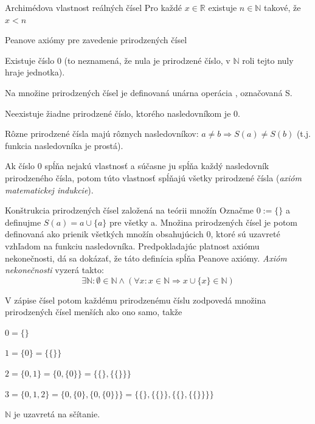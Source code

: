 \begin{vetaN}{Archimédova vlastnost reálných čísel}
	Pro každé $x \in \mathbb{R}$ existuje $n \in \mathbb{N}$ takové, že $x < n$
\end{vetaN}

\begin{vetaN}{Peanove axiómy pre zavedenie prirodzených čísel}
\begin{pitemize}
	\item Existuje číslo 0 (to neznamená, že nula je prirodzené číslo, v $\mathbb{N}$ roli tejto nuly hraje jednotka).
	\item Na množine prirodzených čísel je definovaná unárna operácia , označovaná S.
	\item Neexistuje žiadne prirodzené číslo, ktorého nasledovníkom je 0.
	\item Rôzne prirodzené čísla majú rôznych nasledovníkov: $a \neq b \Rightarrow S(a) \neq S(b)$ (t.j. funkcia nasledovníka je prostá).
	\item Ak číslo 0 spĺňa nejakú vlastnosť a súčasne ju spĺňa každý nasledovník prirodzeného čísla, potom túto vlastnosť spĺňajú všetky prirodzené čísla (\emph{axióm matematickej indukcie}).
\end{pitemize}
\end{vetaN}

\begin{vetaN}{Konštrukcia prirodzených čísel založená na teórii množín}
	Označme $0 := \{ \}$ a definujme $S(a) = a \cup \{a\}$ pre všetky a. Množina prirodzených čísel je potom definovaná ako prienik všetkých množín obsahujúcich $0$, ktoré sú uzavreté vzhľadom na funkciu nasledovníka. Predpokladajúc platnost axiómu nekonečnosti, dá sa dokázať, že táto definícia spĺňa Peanove axiómy. \emph{Axióm nekonečnosti} vyzerá takto:
$$\exists\mathbb{N}:\emptyset\in\mathbb{N}\wedge(\forall x:x\in \mathbb{N}\Rightarrow x\cup\{x\}\in\mathbb{N})$$
	
	V  zápise čísel potom každému prirodzenému číslu zodpovedá množina prirodzených čísel menších ako ono samo, takže
	\begin{pitemize}
		\item $0=\{\}$
		\item $1 = \{0\} = \{\{ \}\}$
		\item $2 = \{0,1\} = \{0, \{0\}\} = \{\{ \}, \{\{ \}\}\}$
		\item $3 = \{0,1,2\} = \{0, \{0\}, \{0, \{0\}\}\} = \{\{ \}, \{\{ \}\}, \{\{ \}, \{\{ \}\}\}\}$
	\end{pitemize}

	$\mathbb{N}$ je uzavretá na sčítanie.
\end{vetaN}

